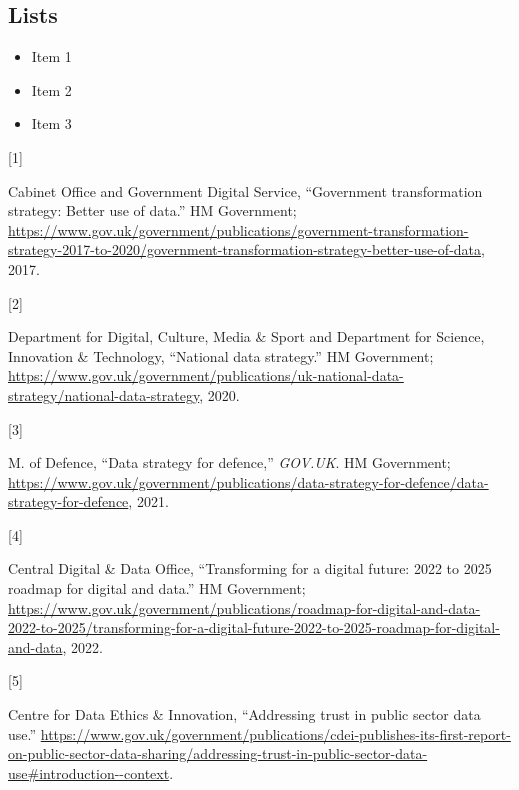 \documentclass{article}
\providecommand{\tightlist}{%
  \setlength{\itemsep}{0pt}\setlength{\parskip}{0pt}}
\newlength{\cslhangindent}
\newlength{\csllabelwidth}
\newlength{\cslentryspacingunit} %
\newenvironment{CSLReferences}[2] %
 {%
  \setlength{\parindent}{0pt}
  \ifodd #1
  \let\oldpar\par
  \def\par{\hangindent=\cslhangindent\oldpar}
  \fi
  \setlength{\parskip}{#2\cslentryspacingunit}
 }%
 {}
\newcommand{\CSLLeftMargin}[1]{\parbox[t]{\csllabelwidth}{#1}}
\newcommand{\CSLRightInline}[1]{\parbox[t]{\linewidth - \csllabelwidth}{#1}\break}
\begin{document}
\hypertarget{lists}{%
\subsection{Lists}\label{lists}}

\begin{itemize}
\tightlist
\item
  Item 1
\item
  Item 2
\item
  Item 3
\end{itemize}

\hypertarget{refs}{}
\begin{CSLReferences}{0}{0}
\leavevmode{}%
\CSLLeftMargin{{[}1{]} }
\CSLRightInline{Cabinet Office and Government Digital Service,
{``Government transformation strategy: Better use of data.''} HM
Government;
\url{https://www.gov.uk/government/publications/government-transformation-strategy-2017-to-2020/government-transformation-strategy-better-use-of-data},
2017.}

\leavevmode{}%
\CSLLeftMargin{{[}2{]} }
\CSLRightInline{Department for Digital, Culture, Media \& Sport and
Department for Science, Innovation \& Technology, {``National data
strategy.''} HM Government;
\url{https://www.gov.uk/government/publications/uk-national-data-strategy/national-data-strategy},
2020.}

\leavevmode{}%
\CSLLeftMargin{{[}3{]} }
\CSLRightInline{M. of Defence, {``Data strategy for defence,''}
\emph{GOV.UK}. HM Government;
\url{https://www.gov.uk/government/publications/data-strategy-for-defence/data-strategy-for-defence},
2021.}

\leavevmode{}%
\CSLLeftMargin{{[}4{]} }
\CSLRightInline{Central Digital \& Data Office, {``Transforming for a
digital future: 2022 to 2025 roadmap for digital and data.''} HM
Government;
\url{https://www.gov.uk/government/publications/roadmap-for-digital-and-data-2022-to-2025/transforming-for-a-digital-future-2022-to-2025-roadmap-for-digital-and-data},
2022.}

\leavevmode{}%
\CSLLeftMargin{{[}5{]} }
\CSLRightInline{Centre for Data Ethics \& Innovation, {``Addressing
trust in public sector data use.''}
\url{https://www.gov.uk/government/publications/cdei-publishes-its-first-report-on-public-sector-data-sharing/addressing-trust-in-public-sector-data-use\#introduction--context}.}


\end{CSLReferences}
\end{document}
